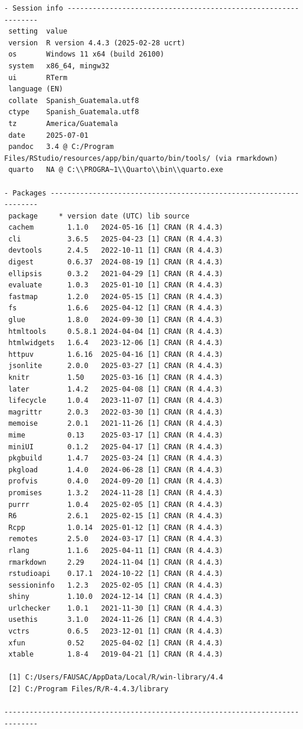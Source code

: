 \documentclass[
  spanish,
  letterpaper,
]{book}
\begin{document}
\begin{verbatim}
- Session info ---------------------------------------------------------------
 setting  value
 version  R version 4.4.3 (2025-02-28 ucrt)
 os       Windows 11 x64 (build 26100)
 system   x86_64, mingw32
 ui       RTerm
 language (EN)
 collate  Spanish_Guatemala.utf8
 ctype    Spanish_Guatemala.utf8
 tz       America/Guatemala
 date     2025-07-01
 pandoc   3.4 @ C:/Program Files/RStudio/resources/app/bin/quarto/bin/tools/ (via rmarkdown)
 quarto   NA @ C:\\PROGRA~1\\Quarto\\bin\\quarto.exe

- Packages -------------------------------------------------------------------
 package     * version date (UTC) lib source
 cachem        1.1.0   2024-05-16 [1] CRAN (R 4.4.3)
 cli           3.6.5   2025-04-23 [1] CRAN (R 4.4.3)
 devtools      2.4.5   2022-10-11 [1] CRAN (R 4.4.3)
 digest        0.6.37  2024-08-19 [1] CRAN (R 4.4.3)
 ellipsis      0.3.2   2021-04-29 [1] CRAN (R 4.4.3)
 evaluate      1.0.3   2025-01-10 [1] CRAN (R 4.4.3)
 fastmap       1.2.0   2024-05-15 [1] CRAN (R 4.4.3)
 fs            1.6.6   2025-04-12 [1] CRAN (R 4.4.3)
 glue          1.8.0   2024-09-30 [1] CRAN (R 4.4.3)
 htmltools     0.5.8.1 2024-04-04 [1] CRAN (R 4.4.3)
 htmlwidgets   1.6.4   2023-12-06 [1] CRAN (R 4.4.3)
 httpuv        1.6.16  2025-04-16 [1] CRAN (R 4.4.3)
 jsonlite      2.0.0   2025-03-27 [1] CRAN (R 4.4.3)
 knitr         1.50    2025-03-16 [1] CRAN (R 4.4.3)
 later         1.4.2   2025-04-08 [1] CRAN (R 4.4.3)
 lifecycle     1.0.4   2023-11-07 [1] CRAN (R 4.4.3)
 magrittr      2.0.3   2022-03-30 [1] CRAN (R 4.4.3)
 memoise       2.0.1   2021-11-26 [1] CRAN (R 4.4.3)
 mime          0.13    2025-03-17 [1] CRAN (R 4.4.3)
 miniUI        0.1.2   2025-04-17 [1] CRAN (R 4.4.3)
 pkgbuild      1.4.7   2025-03-24 [1] CRAN (R 4.4.3)
 pkgload       1.4.0   2024-06-28 [1] CRAN (R 4.4.3)
 profvis       0.4.0   2024-09-20 [1] CRAN (R 4.4.3)
 promises      1.3.2   2024-11-28 [1] CRAN (R 4.4.3)
 purrr         1.0.4   2025-02-05 [1] CRAN (R 4.4.3)
 R6            2.6.1   2025-02-15 [1] CRAN (R 4.4.3)
 Rcpp          1.0.14  2025-01-12 [1] CRAN (R 4.4.3)
 remotes       2.5.0   2024-03-17 [1] CRAN (R 4.4.3)
 rlang         1.1.6   2025-04-11 [1] CRAN (R 4.4.3)
 rmarkdown     2.29    2024-11-04 [1] CRAN (R 4.4.3)
 rstudioapi    0.17.1  2024-10-22 [1] CRAN (R 4.4.3)
 sessioninfo   1.2.3   2025-02-05 [1] CRAN (R 4.4.3)
 shiny         1.10.0  2024-12-14 [1] CRAN (R 4.4.3)
 urlchecker    1.0.1   2021-11-30 [1] CRAN (R 4.4.3)
 usethis       3.1.0   2024-11-26 [1] CRAN (R 4.4.3)
 vctrs         0.6.5   2023-12-01 [1] CRAN (R 4.4.3)
 xfun          0.52    2025-04-02 [1] CRAN (R 4.4.3)
 xtable        1.8-4   2019-04-21 [1] CRAN (R 4.4.3)

 [1] C:/Users/FAUSAC/AppData/Local/R/win-library/4.4
 [2] C:/Program Files/R/R-4.4.3/library

------------------------------------------------------------------------------
\end{verbatim}
\end{document}
